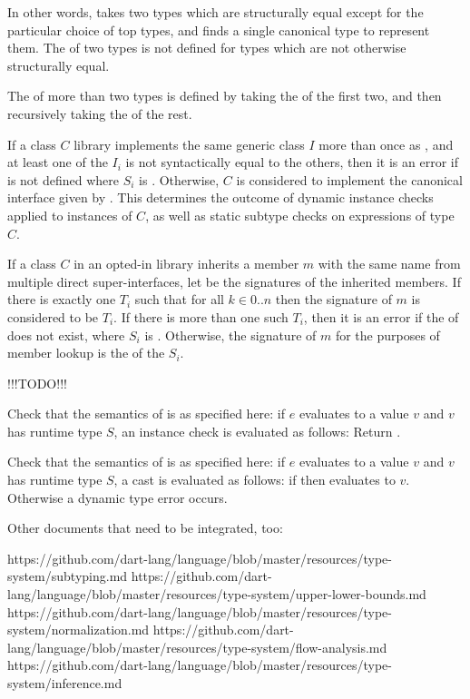 \documentclass[makeidx]{article}
\begin{document}
{In other words, \NnbdTopMergeName{} takes two types which are structurally equal
except for the particular choice of top types, and
finds a single canonical type to represent them.
The \NnbdTopMergeName{} of two types is not defined for
types which are not otherwise structurally equal.

The \NnbdTopMergeName{} of more than two types is defined by taking the
\NnbdTopMergeName{} of the first two, and then recursively taking the
\NnbdTopMergeName{} of the rest.

If a class $C$ library implements the same generic class $I$ more
than once as , and at least one of the $I_i$ is not syntactically
equal to the others, then it is an error if  is not
defined where $S_i$ is .  Otherwise, $C$ is considered to
implement the canonical interface given by . This
determines the outcome of dynamic instance checks applied to instances of $C$,
as well as static subtype checks on expressions of type $C$.

If a class $C$ in an opted-in library inherits a member $m$ with the same name
from multiple direct super-interfaces, let
 be the signatures of the inherited members.  If there is exactly one
$T_i$ such that  for all $k \in 0 .. n$ then the signature
of $m$ is considered to be $T_i$.  If there is more than one such $T_i$, then it
is an error if the \NnbdTopMergeName{} of  does not exist, where $S_i$
is .  Otherwise, the signature of $m$ for the purposes of member
lookup is the \NnbdTopMergeName{} of the $S_i$.

!!!TODO!!!

Check that the semantics of \IS{} is as specified here:
if $e$ evaluates to a value $v$ and $v$ has
runtime type $S$, an instance check  is evaluated as follows:
Return .

Check that the semantics of \AS{} is as specified here:
if $e$ evaluates to a value $v$ and $v$ has
runtime type $S$, a cast  is evaluated as follows:
if  then  evaluates to $v$.
Otherwise a dynamic type error occurs.

Other documents that need to be integrated, too:

https://github.com/dart-lang/language/blob/master/resources/type-system/subtyping.md
https://github.com/dart-lang/language/blob/master/resources/type-system/upper-lower-bounds.md
https://github.com/dart-lang/language/blob/master/resources/type-system/normalization.md
https://github.com/dart-lang/language/blob/master/resources/type-system/flow-analysis.md
https://github.com/dart-lang/language/blob/master/resources/type-system/inference.md

}
\end{document}
